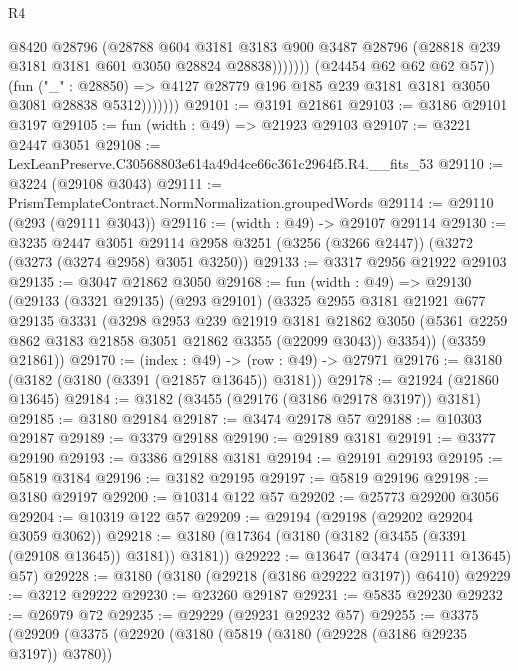 \begin{lexlean}{R4}
\begin{coremodule}
                            @8420
                            @28796
                            (@28788
                              @604
                              @3181
                              @3183
                              @900
                              @3487
                              @28796
                              (@28818 @239 @3181 @3181 @601 @3050 @28824 @28838)))))))
                  (@24454 @62 @62 @62 @57))
                (fun ("_" : @28850) =>
                @4127 @28779 @196 @185 @239 @3181 @3181 @3050 @3081 @28838 @5312)))))))
@29101 := @3191 @21861
@29103 := @3186 @29101 @3197
@29105 := fun (width : @49) => @21923 @29103
@29107 := @3221 @2447 @3051
@29108 := LexLeanPreserve.C30568803e614a49d4ce66c361c2964f5.R4.__fits_53
@29110 := @3224 (@29108 @3043)
@29111 := PrismTemplateContract.NormNormalization.groupedWords
@29114 := @29110 (@293 (@29111 @3043))
@29116 := (width : @49) -> @29107 @29114
@29130 := @3235
    @2447
    @3051
    @29114
    @2958
    @3251
    (@3256 (@3266 @2447))
    (@3272 (@3273 (@3274 @2958) @3051 @3250))
@29133 := @3317 @2956 @21922 @29103
@29135 := @3047 @21862 @3050
@29168 := fun (width : @49) =>
  @29130
    (@29133
      (@3321 @29135)
      (@293 @29101)
      (@3325
        @2955
        @3181
        @21921
        @677
        @29135
        @3331
        (@3298
          @2953
          @239
          @21919
          @3181
          @21862
          @3050
          (@5361 @2259 @862 @3183 @21858 @3051 @21862 @3355 (@22099 @3043))
          @3354))
      (@3359 @21861))
@29170 := (index : @49) -> (row : @49) -> @27971
@29176 := @3180 (@3182 (@3180 (@3391 (@21857 @13645)) @3181))
@29178 := @21924 (@21860 @13645)
@29184 := @3182 (@3455 (@29176 (@3186 @29178 @3197)) @3181)
@29185 := @3180 @29184
@29187 := @3474 @29178 @57
@29188 := @10303 @29187
@29189 := @3379 @29188
@29190 := @29189 @3181
@29191 := @3377 @29190
@29193 := @3386 @29188 @3181
@29194 := @29191 @29193
@29195 := @5819 @3184
@29196 := @3182 @29195
@29197 := @5819 @29196
@29198 := @3180 @29197
@29200 := @10314 @122 @57
@29202 := @25773 @29200 @3056
@29204 := @10319 @122 @57
@29209 := @29194 (@29198 (@29202 @29204 @3059 @3062))
@29218 := @3180 (@17364 (@3180 (@3182 (@3455 (@3391 (@29108 @13645)) @3181)) @3181))
@29222 := @13647 (@3474 (@29111 @13645) @57)
@29228 := @3180 (@3180 (@29218 (@3186 @29222 @3197)) @6410)
@29229 := @3212 @29222
@29230 := @23260 @29187
@29231 := @5835 @29230
@29232 := @26979 @72
@29235 := @29229 (@29231 @29232 @57)
@29255 := @3375
    (@29209
      (@3375
        (@22920
          (@3180
            (@5819 (@3180 (@29228 (@3186 @29235 @3197)) @3780))

\end{coremodule}
\end{lexlean}
